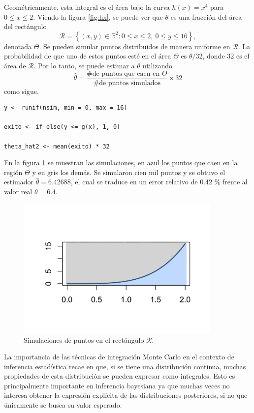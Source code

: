 \documentclass[11pt,a4paper]{article}
\begin{document}
Geométricamente, esta integral es el área bajo la curva $h(x) = x^4$ para $0 \leq x \leq 2$. Viendo la figura \ref{fig:hx}, se puede ver que $\theta$ es una fracción del área del rectángulo $$\mathcal{R} = \left\lbrace (x, y) \in \mathbb{R}^2: 0\leq x \leq 2, \ 0 \leq y \leq 16\right \rbrace,$$ denotada $\Theta$. Se pueden simular puntos distribuidos de manera uniforme en $\mathcal{R}$. La probabilidad de que uno de estos puntos esté en el área $\Theta$ es $\theta / 32$, donde 32 es el área de $\mathcal{R}.$ Por lo tanto, se puede estimar a $\theta$ utilizando $$\hat{\theta} = \frac{\text{\# de puntos que caen en }\Theta}{\text{\# de puntos simulados}} \times 32$$ como sigue.

\begin{lstlisting}
y <- runif(nsim, min = 0, max = 16)

exito <- if_else(y <= g(x), 1, 0)

theta_hat2 <- mean(exito) * 32
\end{lstlisting} \leavevmode\newline

En la figura \ref{fig:sim_hx} se muestran las simulaciones, en azul los puntos que caen en la región $\Theta$ y en gris los demás. Se simularon cien mil puntos y se obtuvo el estimador $\hat{\theta} = 6.42688$, el cual se traduce en un error relativo de 0.42 \% frente al valor real $\theta = 6.4$.

\begin{figure}[h]
\centering\includegraphics[width=10cm]{sim_hx.png}
\caption{Simulaciones de puntos en el rectángulo $\mathcal{R}$.}
\label{fig:sim_hx}
\end{figure}

La importancia de las técnicas de integración Monte Carlo en el contexto de inferencia estadística recae en que, si se tiene una distribución continua, muchas propiedades de esta distribución se pueden expresar como integrales. Esto es principalmente importante en inferencia bayesiana ya que muchas veces no interesa obtener la expresión explícita de las distribuciones posteriores, si no que únicamente se busca su valor esperado.\\
\end{document}
